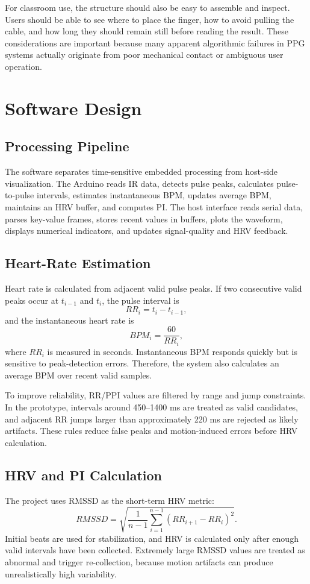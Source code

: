 \documentclass[10pt,conference]{IEEEtran}
\begin{document}
For classroom use, the structure should also be easy to assemble and inspect. Users should be able to see where to place the finger, how to avoid pulling the cable, and how long they should remain still before reading the result. These considerations are important because many apparent algorithmic failures in PPG systems actually originate from poor mechanical contact or ambiguous user operation.

\section{Software Design}
\subsection{Processing Pipeline}
The software separates time-sensitive embedded processing from host-side visualization. The Arduino reads IR data, detects pulse peaks, calculates pulse-to-pulse intervals, estimates instantaneous BPM, updates average BPM, maintains an HRV buffer, and computes PI. The host interface reads serial data, parses key-value frames, stores recent values in buffers, plots the waveform, displays numerical indicators, and updates signal-quality and HRV feedback.

\subsection{Heart-Rate Estimation}
Heart rate is calculated from adjacent valid pulse peaks. If two consecutive valid peaks occur at $t_{i-1}$ and $t_i$, the pulse interval is
\begin{equation}
RR_i=t_i-t_{i-1},
\end{equation}
and the instantaneous heart rate is
\begin{equation}
BPM_i=\frac{60}{RR_i},
\end{equation}
where $RR_i$ is measured in seconds. Instantaneous BPM responds quickly but is sensitive to peak-detection errors. Therefore, the system also calculates an average BPM over recent valid samples.

To improve reliability, RR/PPI values are filtered by range and jump constraints. In the prototype, intervals around 450--1400 ms are treated as valid candidates, and adjacent RR jumps larger than approximately 220 ms are rejected as likely artifacts. These rules reduce false peaks and motion-induced errors before HRV calculation.

\subsection{HRV and PI Calculation}
The project uses RMSSD as the short-term HRV metric:
\begin{equation}
RMSSD=\sqrt{\frac{1}{n-1}\sum_{i=1}^{n-1}(RR_{i+1}-RR_i)^2}.
\end{equation}
Initial beats are used for stabilization, and HRV is calculated only after enough valid intervals have been collected. Extremely large RMSSD values are treated as abnormal and trigger re-collection, because motion artifacts can produce unrealistically high variability.
\end{document}
